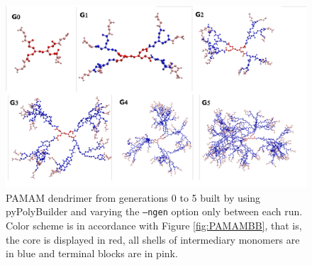\begin{figure}[ht!]
    \centering
    \includegraphics[width=\textwidth]{PAMAM/PAMAMGs.pdf}
    \caption{PAMAM dendrimer from generations 0 to 5 built by using pyPolyBuilder and varying the \texttt{--ngen} option only between each run.
    Color scheme is in accordance with Figure \ref{fig:PAMAMBB}, that is, the core is displayed in red, all shells of intermediary monomers are in blue and terminal blocks are in pink.}
    \label{fig:PAMAMGS}
\end{figure}